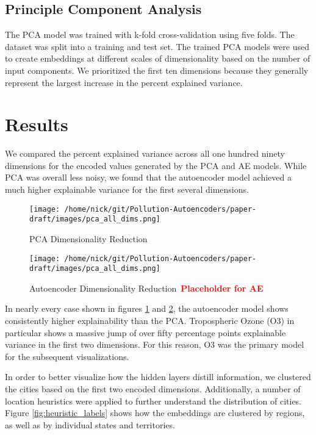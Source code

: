 \documentclass{article}
\newcommand\note[1]{\textbf{\textcolor{red}{#1}}}
\begin{document}
\subsection{Principle Component Analysis}
The PCA model was trained with k-fold cross-validation using five folds. The dataset was split into a training and test set. The trained PCA models were used to create embeddings at different scales of dimensionality based on the number of input components. We prioritized the first ten dimensions because they generally represent the largest increase in the percent explained variance.

\section{Results}

\par We compared the percent explained variance across all one hundred ninety dimensions for the encoded values generated by the PCA and AE models. While PCA was overall less noisy, we found that the autoencoder model achieved a much higher explainable variance for the first several dimensions.

\begin{center}
\begin{figure}[h!]
    \centering
    \texttt{[image: /home/nick/git/Pollution-Autoencoders/paper-draft/images/pca\_all\_dims.png]} 
    \caption{PCA Dimensionality Reduction}
    \label{fig:pca_dim_reduction}
\end{figure}

\begin{figure}[h!]
    \centering
    \texttt{[image: /home/nick/git/Pollution-Autoencoders/paper-draft/images/pca\_all\_dims.png]} 
    \caption{Autoencoder Dimensionality Reduction\ \note{Placeholder for AE}}
    \label{fig:ae_dim_reduction}
\end{figure}
\end{center}

\par In nearly every case shown in figures \ref{fig:pca_dim_reduction} and \ref{fig:ae_dim_reduction}, the autoencoder model shows consistently higher explainability than the PCA. Tropospheric Ozone (O3) in particular shows a massive jump of over fifty percentage points explainable variance in the first two dimensions. For this reason, O3 was the primary model for the subsequent visualizations.
\par In order to better visualize how the hidden layers distill information, we clustered the cities based on the first two encoded dimensions. Additionally, a number of location heuristics were applied to further understand the distribution of cities. Figure \ref{fig:heuristic_labels} shows how the embeddings are clustered by regions, as well as by individual states and territories.
\end{document}
